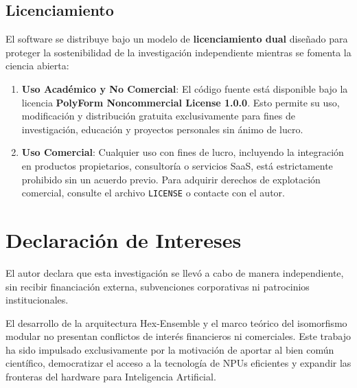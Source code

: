 \documentclass[12pt, a4paper]{article}
\theoremstyle{plain}
\theoremstyle{definition}
\begin{document}
\subsection*{Licenciamiento}
El software se distribuye bajo un modelo de \textbf{licenciamiento dual} diseñado para proteger la sostenibilidad de la investigación independiente mientras se fomenta la ciencia abierta:
\begin{enumerate}
    \item \textbf{Uso Académico y No Comercial}: El código fuente está disponible bajo la licencia \textbf{PolyForm Noncommercial License 1.0.0}. Esto permite su uso, modificación y distribución gratuita exclusivamente para fines de investigación, educación y proyectos personales sin ánimo de lucro.
    \item \textbf{Uso Comercial}: Cualquier uso con fines de lucro, incluyendo la integración en productos propietarios, consultoría o servicios SaaS, está estrictamente prohibido sin un acuerdo previo. Para adquirir derechos de explotación comercial, consulte el archivo \texttt{LICENSE} o contacte con el autor.
\end{enumerate}

\section*{Declaración de Intereses}

El autor declara que esta investigación se llevó a cabo de manera independiente, sin recibir financiación externa, subvenciones corporativas ni patrocinios institucionales. 

El desarrollo de la arquitectura Hex-Ensemble y el marco teórico del isomorfismo modular no presentan conflictos de interés financieros ni comerciales. Este trabajo ha sido impulsado exclusivamente por la motivación de aportar al bien común científico, democratizar el acceso a la tecnología de NPUs eficientes y expandir las fronteras del hardware para Inteligencia Artificial.
\end{document}
